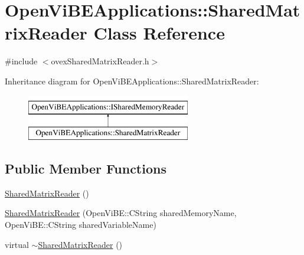 \hypertarget{classOpenViBEApplications_1_1SharedMatrixReader}{
\section{OpenViBEApplications::SharedMatrixReader Class Reference}
\label{classOpenViBEApplications_1_1SharedMatrixReader}
}


{\ttfamily \#include $<$ovexSharedMatrixReader.h$>$}

Inheritance diagram for OpenViBEApplications::SharedMatrixReader:\begin{figure}[H]
\begin{center}
\leavevmode
\includegraphics[height=2.000000cm]{classOpenViBEApplications_1_1SharedMatrixReader}
\end{center}
\end{figure}
\subsection*{Public Member Functions}
\begin{DoxyCompactItemize}
\item 
\hyperlink{classOpenViBEApplications_1_1SharedMatrixReader_a96cd6530066d8f0c104788fd83c805d5}{SharedMatrixReader} ()
\item 
\hyperlink{classOpenViBEApplications_1_1SharedMatrixReader_a509e634570ab0ae98364cad014db28dc}{SharedMatrixReader} (OpenViBE::CString sharedMemoryName, OpenViBE::CString sharedVariableName)
\item 
virtual \hyperlink{classOpenViBEApplications_1_1SharedMatrixReader_ad1405844785b78c211295ff8af6ba06a}{$\sim$SharedMatrixReader} ()
\end{DoxyCompactItemize}
